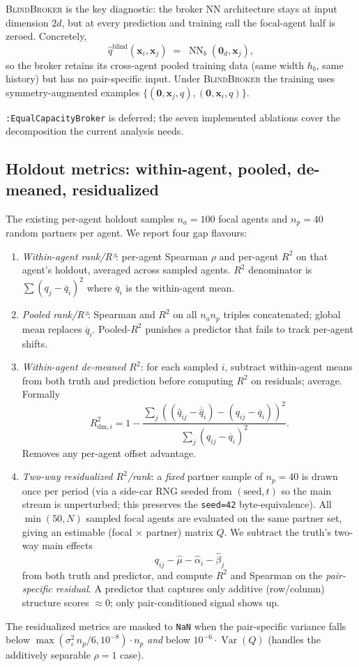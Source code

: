 \documentclass[11pt,a4paper]{article}
\newcommand{\xvec}{\mathbf{x}}
\begin{document}
\textsc{BlindBroker} is the key diagnostic: the broker NN architecture stays at input dimension $2d$, but at every prediction and training call the focal-agent half is zeroed. Concretely,
\begin{equation}
\label{eq:blind}
\hat q^{\text{blind}}(\xvec_i,\xvec_j) \;=\; \operatorname{NN}_b(\mathbf{0}_d,\xvec_j),
\end{equation}
so the broker retains its cross-agent pooled training data (same width $h_b$, same history) but has no pair-specific input. Under \textsc{BlindBroker} the training uses symmetry-augmented examples $\{(\mathbf{0},\xvec_j,q),(\mathbf{0},\xvec_i,q)\}$.

\texttt{:EqualCapacityBroker} is deferred; the seven implemented ablations cover the decomposition the current analysis needs.

\subsection{Holdout metrics: within-agent, pooled, de-meaned, residualized}
The existing per-agent holdout samples $n_a=100$ focal agents and $n_p=40$ random partners per agent. We report four gap flavours:
\begin{enumerate}[label=(\alph*), leftmargin=2em]
\item \emph{Within-agent rank/R²}: per-agent Spearman $\rho$ and per-agent $R^2$ on that agent's holdout, averaged across sampled agents. $R^2$ denominator is $\sum (q_j - \overline{q}_i)^2$ where $\overline{q}_i$ is the within-agent mean.
\item \emph{Pooled rank/R²}: Spearman and $R^2$ on all $n_a n_p$ triples concatenated; global mean replaces $\overline{q}_i$. Pooled-$R^2$ punishes a predictor that fails to track per-agent shifts.
\item \emph{Within-agent de-meaned $R^2$}: for each sampled $i$, subtract within-agent means from both truth and prediction before computing $R^2$ on residuals; average. Formally
\[
R^2_{\text{dm},i} = 1 - \frac{\sum_j ((\hat q_{ij}-\overline{\hat q}_i) - (q_{ij}-\overline q_i))^2}{\sum_j (q_{ij}-\overline q_i)^2}.
\]
Removes any per-agent offset advantage.
\item \emph{Two-way residualized $R^2$/rank}: a \emph{fixed} partner sample of $n_p=40$ is drawn once per period (via a side-car RNG seeded from $(\text{seed},t)$ so the main stream is unperturbed; this preserves the \texttt{seed=42} byte-equivalence). All $\min(50,N)$ sampled focal agents are evaluated on the same partner set, giving an estimable (focal $\times$ partner) matrix $Q$. We subtract the truth's two-way main effects
\[
q_{ij} - \hat\mu - \hat\alpha_i - \hat\beta_j
\]
from both truth and predictor, and compute $R^2$ and Spearman on the \emph{pair-specific residual}. A predictor that captures only additive (row/column) structure scores $\approx 0$; only pair-conditioned signal shows up.
\end{enumerate}
The residualized metrics are masked to \texttt{NaN} when the pair-specific variance falls below $\max(\sigma_\varepsilon^2\,n_p/6,10^{-8})\cdot n_p$ \emph{and} below $10^{-6}\cdot \operatorname{Var}(Q)$ (handles the additively separable $\rho=1$ case).
\end{document}
